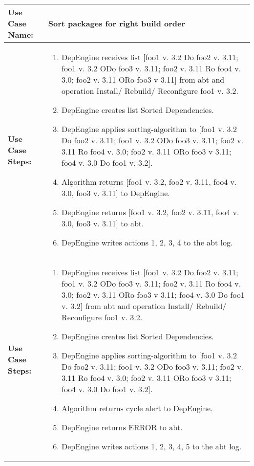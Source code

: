 \begin{tabularx}{\linewidth}{|l|X|}
\hline
\textbf{Use Case Name:} & \textbf{Sort packages for right build order} \\
\hline
\textbf{Use Case Steps:} & 
\begin{minipage}{\linewidth} 
  \vspace{0.05em}
  \begin{enumerate}
  \item DepEngine receives list [foo1 v. 3.2 Do foo2 v. 3.11; foo1 v. 3.2 ODo foo3 v. 3.11; foo2 v. 3.11 Ro foo4 v. 3.0; foo2 v. 3.11 ORo foo3 v 3.11] from abt and operation Install/ Rebuild/ Reconfigure foo1 v. 3.2.
  \item DepEngine creates list Sorted Dependencies.
  \item DepEngine applies sorting-algorithm to [foo1 v. 3.2 Do foo2 v. 3.11; foo1 v. 3.2 ODo foo3 v. 3.11; foo2 v. 3.11 Ro foo4 v. 3.0; foo2 v. 3.11 ORo foo3 v 3.11; foo4 v. 3.0 Do foo1 v. 3.2].
   \item Algorithm returns [foo1 v. 3.2, foo2 v. 3.11, foo4 v. 3.0, foo3 v. 3.11] to DepEngine.
  \item DepEngine returns [foo1 v. 3.2, foo2 v. 3.11, foo4 v. 3.0, foo3 v. 3.11] to abt.  
  \item DepEngine writes actions 1, 2, 3, 4 to the abt log.
    \end{enumerate}
  \vspace{0.05em}
\end{minipage}
\\
\hline
\textbf{Use Case Steps:} & 
\begin{minipage}{\linewidth} 
  \vspace{0.05em}
  \begin{enumerate}
  \item DepEngine receives list [foo1 v. 3.2 Do foo2 v. 3.11; foo1 v. 3.2 ODo foo3 v. 3.11; foo2 v. 3.11 Ro foo4 v. 3.0; foo2 v. 3.11 ORo foo3 v 3.11; foo4 v. 3.0 Do foo1 v. 3.2] from abt and operation Install/ Rebuild/ Reconfigure foo1 v. 3.2.
  \item DepEngine creates list Sorted Dependencies.
  \item DepEngine applies sorting-algorithm to [foo1 v. 3.2 Do foo2 v. 3.11; foo1 v. 3.2 ODo foo3 v. 3.11; foo2 v. 3.11 Ro foo4 v. 3.0; foo2 v. 3.11 ORo foo3 v 3.11; foo4 v. 3.0 Do foo1 v. 3.2].
  \item Algorithm returns cycle alert to DepEngine.
  \item DepEngine returns ERROR to abt.
  \item DepEngine writes actions 1, 2, 3, 4, 5 to the abt log.
    \end{enumerate}
  \vspace{0.05em}
\end{minipage}
\\
\hline
\end{tabularx}
\newpage

